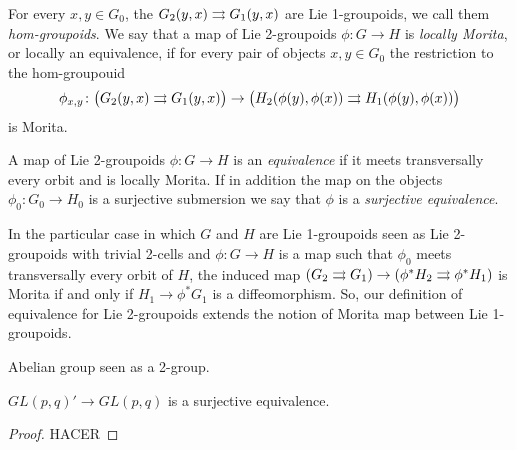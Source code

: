 For every $x, y\in G_0$, the $G_2(y,x)\rightrightarrows G_1(y,x)$ are Lie 1-groupoids, we call them \emph{hom-groupoids}.
We say that a map of Lie 2-groupoids $\phi\colon G\to H$ is \emph{locally Morita}, or locally an equivalence, if for every pair of objects $x, y\in G_0$ the restriction to the hom-groupouid
\[ \phi_{x,y}\colon \big( G_2(y,x)\rightrightarrows G_1(y,x) \big) \to \big( H_2(\phi(y),\phi(x))\rightrightarrows H_1(\phi(y),\phi(x)) \big) \]
is Morita.

\begin{mydef}
A map of Lie 2-groupoids $\phi\colon G\to H$ is an \emph{equivalence} if it meets transversally every orbit and is locally Morita.
If in addition the map on the objects $\phi_0\colon G_0\to H_0$ is a surjective submersion we say that $\phi$ is a \emph{surjective equivalence}.
\end{mydef}

\begin{example}
In the particular case in which $G$ and $H$ are Lie 1-groupoids seen as Lie 2-groupoids with trivial 2-cells and $\phi: G\to H$ is a map such that $\phi_0$ meets transversally every orbit of $H$, the induced map $(G_2\rightrightarrows G_1)\to (\phi^*H_2\rightrightarrows \phi^*H_1)$ is Morita if and only if $H_1\to \phi^*G_1$ is a diffeomorphism.
So, our definition of equivalence for Lie 2-groupoids extends the notion of Morita map between Lie 1-groupoids.
\end{example}

\begin{example}
Abelian group seen as a 2-group.
\end{example}

\begin{lemma}
$GL(p,q)' \to GL(p,q)$ is a surjective equivalence.
\end{lemma}

\begin{proof}
HACER
\end{proof}

